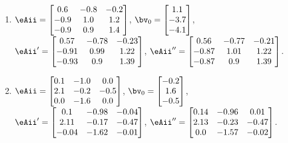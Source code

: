 \begin{exercise}
\begin{enumerate}
\item \(\eAii=\begin{bmatrix} 0.6&-0.8&-0.2
\\-0.9&1.0&1.2
\\-0.9&0.9&1.4 \end{bmatrix}\),
\(\bv_{\arabic{enumii}}=\begin{bmatrix} 1.1
\\-3.7
\\-4.1 \end{bmatrix}\), 
\(\eAii'=\begin{bmatrix} 0.57&-0.78&-0.23
\\-0.91&0.99&1.22
\\-0.93&0.9&1.39 \end{bmatrix}\),
\(\eAii''=\begin{bmatrix} 0.56&-0.77&-0.21
\\-0.87&1.01&1.22
\\-0.87&0.9&1.39 \end{bmatrix}\).

\item \(\eAii=\begin{bmatrix} 0.1&-1.0&0.0
\\2.1&-0.2&-0.5
\\0.0&-1.6&0.0 \end{bmatrix}\),
\(\bv_{\arabic{enumii}}=\begin{bmatrix} -0.2
\\1.6
\\-0.5 \end{bmatrix}\), 
\(\eAii'=\begin{bmatrix} 0.1&-0.98&-0.04
\\2.11&-0.17&-0.47
\\-0.04&-1.62&-0.01 \end{bmatrix}\),
\(\eAii''=\begin{bmatrix} 0.14&-0.96&0.01
\\2.13&-0.23&-0.47
\\0.0&-1.57&-0.02 \end{bmatrix}\).


\end{enumerate}
\end{exercise}
